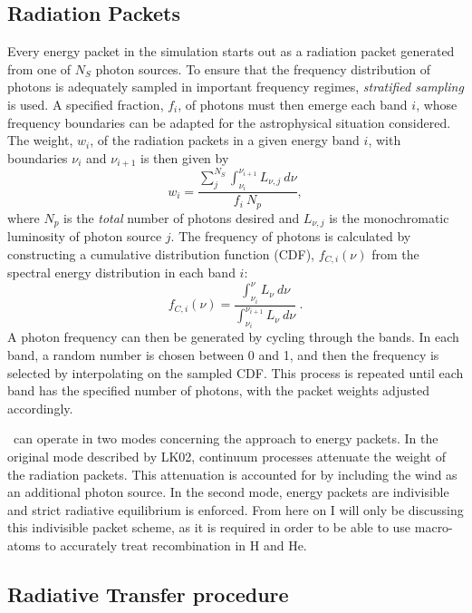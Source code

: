 \subsection{Radiation Packets}
\label{sec:packets}
Every energy packet in the simulation starts out as a radiation packet generated
from one of $N_S$ photon sources. To ensure that the frequency distribution
of photons is adequately sampled in important frequency regimes, 
{\em stratified sampling} is used. A specified fraction, $f_i$,
of photons must then emerge each band $i$, whose frequency boundaries
can be adapted for the astrophysical situation considered. 
The weight, $w_i$, of the radiation packets in a given energy band $i$, with boundaries
$\nu_i$ and $\nu_{i+1}$ is then given by
\begin{equation}
w_i = \frac{\sum_j^{N_S} \int_{\nu_i}^{\nu_{i+1}} L_{\nu,j}~d\nu}{f_i~N_p},
\end{equation}
where $N_p$ is the {\em total} number of photons desired 
and $L_{\nu,j}$ is the monochromatic 
luminosity of photon source $j$. 
The frequency of photons is calculated by constructing a 
cumulative distribution function (CDF), $f_{C,i}(\nu)$
from the spectral energy distribution in each band $i$: 
\begin{equation}
f_{C,i} (\nu) = 
\frac{\int_{\nu_i}^{\nu} L_\nu~d\nu}
{\int_{\nu_i}^{\nu_{i+1}} L_\nu~d\nu} ~.
\end{equation}
A photon frequency can then be generated by cycling through the bands. In each band,
a random number is chosen between 0 and 1, and then the frequency is 
selected by interpolating on the sampled CDF. This process is repeated until 
each band has the specified number of photons, with the packet
weights adjusted accordingly.

\py\ can operate in two modes concerning the approach to energy packets. 
In the original mode described by LK02, continuum processes attenuate 
the weight of the radiation packets. This attenuation is accounted for 
by including the wind as an additional photon source.
In the second mode, energy packets are indivisible and strict radiative equilibrium is
enforced. From here on I will only be discussing this indivisible packet scheme, 
as it is required in order to be able to use macro-atoms to accurately
treat recombination in H and He.

\subsection{Radiative Transfer procedure}

